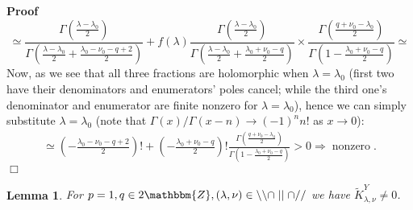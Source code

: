 \documentclass[12pt]{article}
\newcommand{\tmop}[1]{\ensuremath{\operatorname{#1}}}
\renewenvironment{proof}{\noindent\textbf{Proof\ }}{\hspace*{\fill}$\Box$\medskip}
\newtheorem{lemma}[proposition]{Lemma}
\theoremstyle{remark}
\begin{document}
\begin{proof}
\[     \simeq \frac{\Gamma \left( \frac{\lambda - \lambda_0}{2} \right)}{\Gamma
     \left( \frac{\lambda - \lambda_0}{2} + \frac{\lambda_0 - \nu_0 - q +
     2}{2} \right)} + f (\lambda) \frac{\Gamma \left( \frac{\lambda -
     \lambda_0}{2} \right)}{\Gamma \left( \frac{\lambda - \lambda_0}{2} +
     \frac{\lambda_0 + \nu_0 - q}{2} \right)} \times \frac{\Gamma \left(
     \frac{q + \nu_0 - \lambda_0}{2} \right)}{\Gamma \left( 1 -
     \frac{\lambda_0 + \nu_0 - q}{2} \right)} \simeq \]
  Now, as we see that all three fractions are holomorphic when $\lambda =
  \lambda_0$ (first two have their denominators and enumerators' poles cancel;
  while the third one's denominator and enumerator are finite nonzero for
  $\lambda = \lambda_0$), hence we can simply substitute $\lambda = \lambda_0$
  (note that $\Gamma (x) / \Gamma (x - n) \rightarrow (- 1)^n n!$ as $x
  \rightarrow 0$):
  \begin{eqnarray}
    & \simeq \left( - \frac{\lambda_0 - \nu_0 - q + 2}{2} \right) ! + \left(
    - \frac{\lambda_0 + \nu_0 - q}{2} \right) ! \frac{\Gamma \left( \frac{q +
    \nu_0 - \lambda_0}{2} \right)}{\Gamma \left( 1 - \frac{\lambda_0 + \nu_0 -
    q}{2} \right)} > 0 \Rightarrow \tmop{nonzero} . &  \nonumber
  \end{eqnarray}
\end{proof}

\begin{lemma}
  \label{supp-sing:lem-strangelove-Y}For $p = 1, q \in 2\mathbbm{Z}, (\lambda,
  \nu) \in \backslash\backslash \cap \mid \mid \cap / /$ we have
  $\tilde{K}_{\lambda, \nu}^Y \neq 0$.
\end{lemma}
\end{document}
